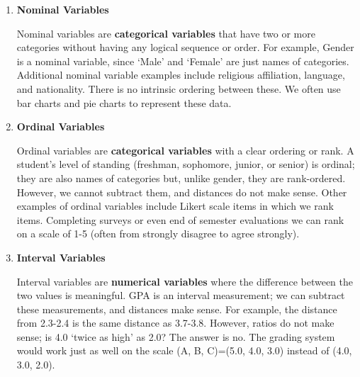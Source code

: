 \documentclass[11pt]{book}\usepackage[]{graphicx}\usepackage[]{color}
\begin{document}
\begin{enumerate}
\item \textbf{Nominal Variables}

Nominal variables are \textbf{categorical variables} that have two or more categories without having any logical sequence or order. For example, Gender is a nominal variable, since `Male' and `Female' are just names of categories.  Additional nominal variable examples include religious affiliation, language, and nationality.   There is no intrinsic ordering between these.  We often use bar charts and pie charts to represent these data.


\item \textbf{Ordinal Variables}

Ordinal variables are \textbf{categorical variables} with a clear ordering or rank.  A student's level of standing (freshman, sophomore, junior, or senior) is ordinal; they are also names of categories but, unlike gender, they are rank-ordered.   However, we cannot subtract them, and distances do not make sense.  Other examples of ordinal variables include Likert scale items in which we rank items.  Completing surveys or even end of semester evaluations we can rank on a scale of 1-5 (often from strongly disagree to agree strongly).


\item \textbf{Interval Variables}

Interval variables are \textbf{numerical variables} where the difference between the two values is meaningful.  GPA is an interval measurement; we can subtract these measurements, and distances make sense.  For example, the distance from 2.3-2.4 is the same distance as 3.7-3.8.  However, ratios do not make sense; is 4.0 `twice as high' as 2.0?  The answer is no.  The grading system would work just as well on the scale (A, B, C)=(5.0, 4.0, 3.0) instead of (4.0, 3.0, 2.0).


\end{enumerate}
\end{document}
